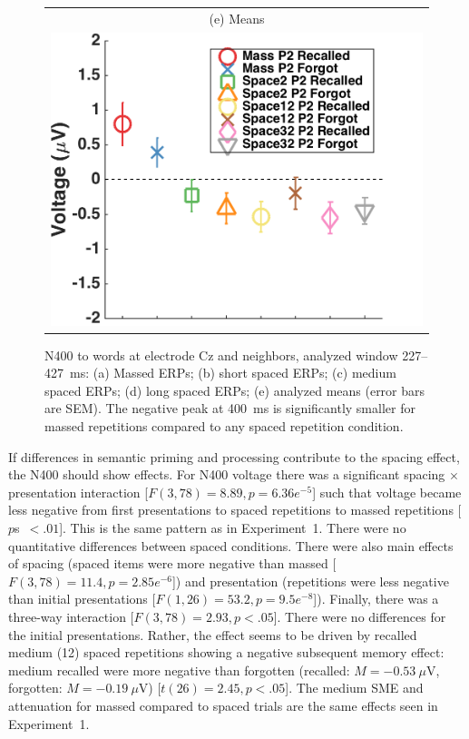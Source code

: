\begin{figure}[hp]
\begin{tabular}{cc}
  \multicolumn{2}{c}{(e) Means} \\
  \multicolumn{2}{c}{\includegraphics[width=.35\textwidth]{./figs/exp2/tla_avg_ga_word_rc_mass_p2_word_fo_mass_p2_word_rc_spac2_p2_word_fo_spac2_p2_word_rc_spac12_p2_word_fo_spac12_p2_word_rc_spac32_p2_word_fo_spac32_p2_C_277_427_ylabel}} \\
  \end{tabular}
  \caption{N400 to words at electrode Cz and neighbors, analyzed window 227--427~ms: (a) Massed ERPs; (b) short spaced ERPs; (c) medium spaced ERPs; (d) long spaced ERPs; (e) analyzed means (error bars are SEM).  The negative peak at 400~ms is significantly smaller for massed repetitions compared to any spaced repetition condition.}
  \label{fig:s2_N400}
\end{figure}


If differences in semantic priming and processing contribute to the spacing effect, the N400 should show effects.
For N400 voltage there was a significant spacing $\times$ presentation interaction [$F(3,78)=8.89, p=6.36e^{-5}$] such that voltage became less negative from first presentations to spaced repetitions to massed repetitions [$p$s~$<.01$].  This is the same pattern as in Experiment~1.  There were no quantitative differences between spaced conditions.  There were also main effects of spacing (spaced items were more negative than massed [$F(3,78)=11.4, p=2.85e^{-6}$]) and presentation (repetitions were less negative than initial presentations [$F(1,26)=53.2, p=9.5e^{-8}$]).  Finally, there was a three-way interaction [$F(3,78)=2.93, p<.05$].  There were no differences for the initial presentations.  Rather, the effect seems to be driven by recalled medium (12) spaced repetitions showing a negative subsequent memory effect: medium recalled were more negative than forgotten (recalled: $M=-0.53~\mu$V, forgotten: $M=-0.19~\mu$V) [$t(26)=2.45, p<.05$].  
The medium SME and attenuation for massed compared to spaced trials are the same effects seen in Experiment~1.



